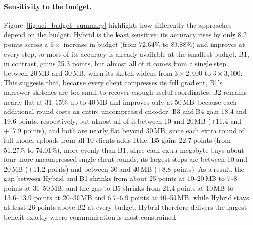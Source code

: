 \documentclass[sigconf]{acmart}
\newcommand{\method}{Hybrid}   %
\begin{document}
\paragraph{Sensitivity to the budget.}
Figure~\ref{fig:uci_budget_summary} highlights how differently the
approaches depend on the budget. \method{} is the least sensitive: its accuracy
rises by only 8.2 points across a $5\times$ increase in budget (from 72.64\% to
80.88\%) and improves at every step, so most of its accuracy is already
available at the smallest budget. B1, in contrast, gains 25.3 points, but
almost all of it comes from a single step between 20\,MB and 30\,MB, when its
sketch widens from $3\times2{,}000$ to $3\times3{,}000$. This suggests that,
because every client compresses its full gradient, B1's narrower sketches are
too small to recover enough useful coordinates. B2 remains nearly flat at
31--35\% up to 40\,MB and improves only at 50\,MB, because each additional
round costs an entire uncompressed encoder. B3 and B4 gain 18.4 and 19.6
points, respectively, but almost all of it between 10 and 20\,MB (+11.4 and
+17.9 points), and both are nearly flat beyond 30\,MB, since each extra round
of full-model uploads from all 10 clients adds little. B5 gains 22.7 points (from 51.27\%
to 74.01\%), more evenly than B1, since each extra megabyte buys about four more
uncompressed single-client rounds; its largest steps are between 10 and 20\,MB
(+11.2 points) and between 30 and 40\,MB (+8.8 points). As a result, the gap
between \method{} and B1 shrinks from about 25 points at 10--20\,MB to 7--8
points at 30--50\,MB, and the gap to B5 shrinks from 21.4 points at 10\,MB to
13.6--13.9 points at 20--30\,MB and 6.7--6.9 points at 40--50\,MB, while
\method{} stays at least 26 points above B2 at every budget.
\method{} therefore delivers the largest benefit exactly where communication is
most constrained.
\end{document}
